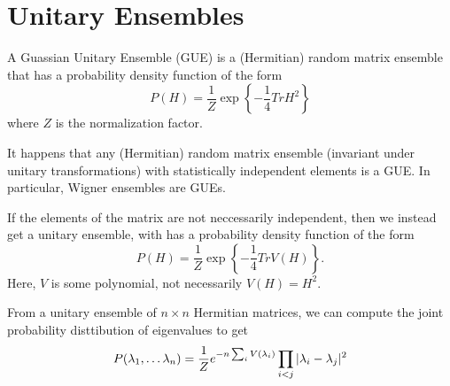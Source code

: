 \section{Unitary Ensembles}
A Guassian Unitary Ensemble (GUE) is a (Hermitian) random matrix ensemble that has a probability density function of the form
\[
    P(H) = \frac{1}{Z}\exp\left\{ -\frac{1}{4}Tr H^2 \right\}
\]
where $Z$ is the normalization factor.

It happens that any (Hermitian) random matrix ensemble (invariant under unitary transformations) with statistically independent elements is a GUE. In particular, Wigner ensembles are GUEs.

If the elements of the matrix are not neccessarily independent, then we instead get a unitary ensemble, with has a probability density function of the form
\[
    P(H) = \frac{1}{Z}\exp\left\{ -\frac{1}{4}Tr V(H) \right\}.
\]
Here, $V$ is some polynomial, not necessarily $V(H) = H^2$.

From a unitary ensemble of $n \times n$ Hermitian matrices, we can compute the joint probability disttibution of eigenvalues to get
\[
    P(\lambda_1, \dots \lambda_n) = \frac{1}{Z}e^{-n \sum_i V(\lambda_i)} \prod_{i < j} |\lambda_i-\lambda_j|^2
\]
